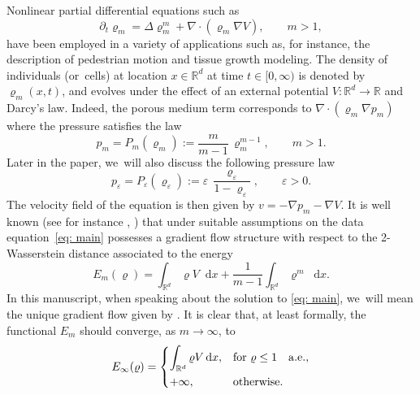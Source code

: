 \documentclass[10pt]{amsart}
\newcommand{\dx}[1]{\mathop{}\!\mathrm{d} #1}
\newcommand{\R}{\mathbb{R}}
\theoremstyle{plain}
\theoremstyle{remark}
\begin{document}
Nonlinear partial differential equations such as
\begin{equation}\label{eq: main}
\partial_{t} \varrho_m = \Delta \varrho_m^m + \nabla \cdot (\varrho_m \nabla V), \qquad m>1,
\end{equation}
have been employed in a variety of applications such as, for instance, the description of pedestrian motion and tissue growth modeling. The density of individuals (or~cells) at location $x\in\R^d$ at time $t \in [0,\infty)$ is denoted by $\varrho_m(x,t)$, and evolves under the effect of an external potential $V:\R^d\to\R$ and Darcy's law. Indeed, the porous medium term corresponds to $\nabla \cdot(\varrho_m\nabla p_m)$ where the pressure satisfies the law
\begin{equation}\label{eq: pressure power law}
p_m= P_m(\varrho_m):=\frac{m}{m-1}\, \varrho_m^{m-1}, \qquad m>1.
\end{equation}
Later in the paper, we~will also discuss the following pressure law
\begin{equation}
\label{singular pressure}
p_\varepsilon= P_\varepsilon(\varrho_\varepsilon):= \varepsilon\, \frac{\varrho_\varepsilon}{1-\varrho_\varepsilon}, \qquad \varepsilon>0.
\end{equation}
The velocity field of the equation is then given by $v = -\nabla p_m -\nabla V$.
It is well known (see for instance \cite[Th.\,11.2.8]{AGS2008}, \cite{Otto}) that under suitable assumptions on the data equation~\eqref{eq: main} possesses a gradient flow structure with respect to the 2\nobreakdash-Wasserstein distance associated to the energy
\begin{equation*}
\label{eq: energy}
E_m(\varrho)= \int_{\R^d} \varrho V \dx x + \frac{1}{m-1}\int_{\R^d} \varrho^m \dx x.
\end{equation*}
In this manuscript, when speaking about the solution to \eqref{eq: main}, we~will mean the unique gradient flow given by \cite[Th.\,11.2.8]{AGS2008}.
It is clear that, at least formally, the functional $E_m$ should converge, as $m\to\infty$, to
\begin{equation*}\label{eq: energy infty}
E_\infty(\varrho)=
\begin{dcases}
\int_{\R^d} \varrho V \dx x, &\text{for } \varrho\leq 1 \quad\mathrm{a.e.},\\
+\infty, &\text{otherwise.}
\end{dcases}
\end{equation*}
\end{document}
